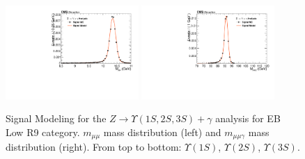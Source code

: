 \begin{figure}[!htbp]
\begin{center}
\includegraphics[width=0.45\textwidth]{figures/fitPlotFiles2D/ZToUpsilonPhotonSignalAndBackgroundFit/mMuMNU_ZToUpsilon3SPhotonSignalAndBackgroundFit_Signal_Cat2}\hspace*{1.cm}
\includegraphics[width=0.45\textwidth]{figures/fitPlotFiles2D/ZToUpsilonPhotonSignalAndBackgroundFit/mHZ_ZToUpsilon3SPhotonSignalAndBackgroundFit_Signal_Cat2_default}\hspace*{1.cm}


\end{center}\vspace*{-.5cm}
\caption{Signal Modeling for the $Z \rightarrow \Upsilon(1S,2S,3S) +\gamma$ analysis for EB Low R9 category. $m_{\mu\mu}$ mass distribution (left) and $m_{\mu\mu\gamma}$ mass distribution (right). From top to bottom: $\Upsilon(1S)$, $\Upsilon(2S)$, $\Upsilon(3S)$.}
\label{fig:ZToUpsilon_Signal_Cat2}
\end{figure}

